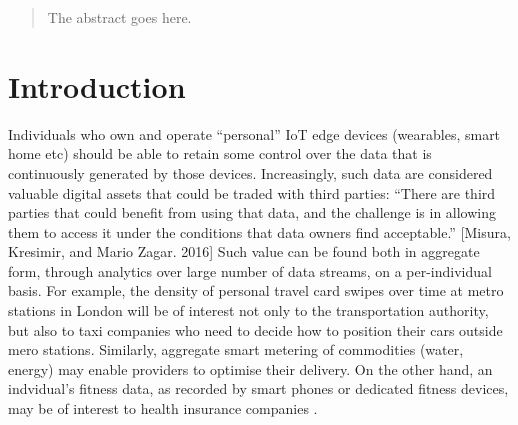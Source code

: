\documentclass[conference]{IEEEtran}
\begin{document}




\maketitle

\begin{abstract}
The abstract goes here.
\end{abstract}





%
\IEEEpeerreviewmaketitle



\section{Introduction}

Individuals who own and operate “personal” IoT edge devices (wearables, smart home etc) should be able to retain some control over the data that is continuously generated by those devices.
Increasingly, such data are considered valuable digital assets that could be traded with third parties:  “There are third parties that could benefit from using that data, and the challenge is in allowing them to access it under the conditions that data owners find acceptable.” [Misura, Kresimir, and Mario Zagar. 2016]
Such value can be found both in aggregate form, through analytics over large number of data streams, on a per-individual basis. 
For example, the density of personal travel card swipes over time at metro stations in London will be of interest not only to the transportation authority, but also to taxi companies who need to decide how to position their cars outside mero stations. Similarly, aggregate smart metering of commodities (water, energy) may enable providers to optimise their delivery.
On the other hand, an indvidual’s fitness data, as recorded by smart phones or dedicated fitness devices, may be of interest to health insurance companies .
\end{document}
